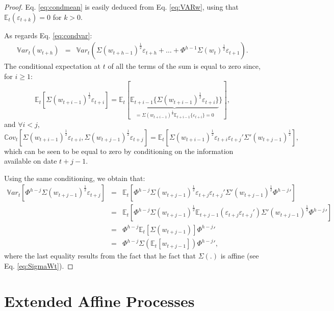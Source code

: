 \documentclass[
  12pt,
]{book}
\theoremstyle{definition}
\theoremstyle{definition}
\theoremstyle{definition}
\theoremstyle{definition}
\theoremstyle{remark}
\begin{document}
\begin{proof}
Eq. \eqref{eq:condmean} is easily deduced from Eq. \eqref{eq:VARw}, using that \(\mathbb{E}_t(\varepsilon_{t+k})=0\) for \(k>0\).

As regards Eq. \eqref{eq:condvar}:
\begin{eqnarray*}
\mathbb{V}ar_t(w_{t+h}) &=& \mathbb{V}ar_t\left(\Sigma(w_{t+h-1})^{\frac{1}{2}}\varepsilon_{t+h}+\dots + \Phi^{h-1} \Sigma(w_{t})^{\frac{1}{2}}\varepsilon_{t+1} \right).
\end{eqnarray*}
The conditional expectation at \(t\) of all the terms of the sum is equal to zero since, for \(i \ge 1\):
\[
\mathbb{E}_t\left[\Sigma(w_{t+i-1})^{\frac{1}{2}}\varepsilon_{t+i}\right] = \mathbb{E}_t[\underbrace{\mathbb{E}_{t+i-1}\{\Sigma(w_{t+i-1})^{\frac{1}{2}}\varepsilon_{t+i}\}}_{=\Sigma(w_{t+i-1})^{\frac{1}{2}}\mathbb{E}_{t+i-1}\{\varepsilon_{t+i}\}=0}\}],
\]
and \(\forall i <j\),
\[
\mathbb{C}ov_t\left[\Sigma(w_{t+i-1})^{\frac{1}{2}}\varepsilon_{t+i},\Sigma(w_{t+j-1})^{\frac{1}{2}}\varepsilon_{t+j}\right] = \mathbb{E}_t\left[\Sigma(w_{t+i-1})^{\frac{1}{2}}\varepsilon_{t+i}\varepsilon_{t+j}'\Sigma'(w_{t+j-1})^{\frac{1}{2}}\right],
\]
which can be seen to be equal to zero by conditioning on the information available on date \(t+j-1\).

Using the same conditioning, we obtain that:
\begin{eqnarray*}
\mathbb{V}ar_t\left[\Phi^{h-j}\Sigma(w_{t+j-1})^{\frac{1}{2}}\varepsilon_{t+j}\right] &=& \mathbb{E}_t\left[\Phi^{h-j}\Sigma(w_{t+j-1})^{\frac{1}{2}}\varepsilon_{t+j}\varepsilon_{t+j}'\Sigma'(w_{t+j-1})^{\frac{1}{2}}{\Phi^{h-j}}'\right] \\
&=&  \mathbb{E}_t\left[\Phi^{h-j}\Sigma(w_{t+j-1})^{\frac{1}{2}} \mathbb{E}_{t+j-1}(\varepsilon_{t+j}\varepsilon_{t+j}')\Sigma'(w_{t+j-1})^{\frac{1}{2}}{\Phi^{h-j}}'\right] \\
&=&  \Phi^{h-j}\mathbb{E}_t[\Sigma(w_{t+j-1})]{\Phi^{h-j}}' \\
&=&  \Phi^{h-j}\Sigma(\mathbb{E}_t[w_{t+j-1}]){\Phi^{h-j}}',
\end{eqnarray*}
where the last equality results from the fact that he fact that \(\Sigma(.)\) is affine (see Eq. \eqref{eq:SigmaWt}).
\end{proof}

\hypertarget{AffineExtended}{%
\section{Extended Affine Processes}\label{AffineExtended}}
\end{document}
